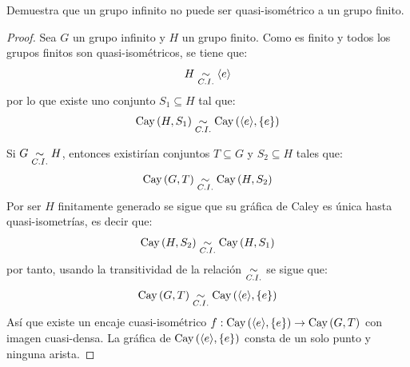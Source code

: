 \documentclass[12pt]{report}
\newcounter{it}
\theoremstyle{largebreak}
\newcommand\cf[3]{\ensuremath{#1:#2\rightarrow#3}}
\newcommand{\Cay}[1]{\ensuremath{\textup{Cay}\left(#1\right)}}
\newcommand{\gen}[1]{\ensuremath{\langle#1\rangle}}
\begin{document}
    \begin{excer}
        Demuestra que un grupo infinito no puede ser quasi-isométrico a un grupo finito.
    \end{excer}

    \begin{proof}
        Sea $G$ un grupo infinito y $H$ un grupo finito. Como es finito y todos los grupos finitos son quasi-isométricos, se tiene que:
        \begin{equation*}
            H\qisom\gen{e}
        \end{equation*}
        por lo que existe uno conjunto $S_1\subseteq H$ tal que:
        \begin{equation*}
            \Cay{H,S_1}\qisom\Cay{\gen{e},\left\{e\right\}}
        \end{equation*}

        Si $G\underset{C.I.}{\sim} H$, entonces existirían conjuntos $T\subseteq G$ y $S_2\subseteq H$ tales que:
        \begin{equation*}
            \Cay{G,T}\qisom\Cay{H,S_2}
        \end{equation*}
        Por ser $H$ finitamente generado se sigue que su gráfica de Caley es única hasta quasi-isometrías, es decir que:
        \begin{equation*}
            \Cay{H,S_2}\qisom \Cay{H,S_1}
        \end{equation*}
        por tanto, usando la transitividad de la relación $\underset{C.I.}{\sim}$ se sigue que:
        \begin{equation*}
            \Cay{G,T}\qisom\Cay{\gen{e},\left\{e\right\}}
        \end{equation*}
        Así que existe un encaje cuasi-isométrico $\cf{f}{\Cay{\gen{e},\left\{e\right\}}}{\Cay{G,T}}$ con imagen cuasi-densa. La gráfica de $\Cay{\gen{e},\left\{e\right\}}$ consta de un solo punto y ninguna arista.


\end{proof}
\end{document}
